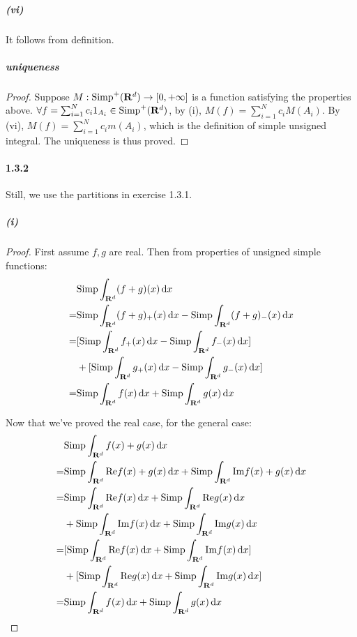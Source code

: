 \documentclass{article}
\begin{document}
\subparagraph{(vi)}
It follows from definition.
\subparagraph{uniqueness}
\begin{proof}
Suppose $M:\mathrm{Simp}^+(\mathbf{R}^d)\to [0,+\infty]$ is a function satisfying the properties above. $\forall f=\sum_{i=1}^{N} c_i1_{A_i}\in \mathrm{Simp}^+(\mathbf{R}^d)$, by (i), $M(f)=\sum_{i=1}^{N}c_iM(A_i)$. By (vi), $M(f)=\sum_{i=1}^Nc_im(A_i)$, which is the definition of simple unsigned integral. The uniqueness is thus proved.
\end{proof}

\paragraph{1.3.2}
Still, we use the partitions in exercise 1.3.1.
\subparagraph{(i)}
\begin{proof}
First assume $f,g$ are real. Then from properties of unsigned simple functions:
\[\begin{aligned}
&\mathrm{Simp}\int_{\mathbf{R}^d}(f+g)(x)\,\mathrm{d} x\\
=&\mathrm{Simp}\int_{\mathbf{R}^d}(f+g)_+(x)\,\mathrm{d} x-\mathrm{Simp}\int_{\mathbf{R}^d}(f+g)_-(x)\,\mathrm{d} x\\
=&[\mathrm{Simp}\int_{\mathbf{R}^d}f_+(x)\,\mathrm{d} x-\mathrm{Simp}\int_{\mathbf{R}^d}f_-(x)\,\mathrm{d} x]\\
&+[\mathrm{Simp}\int_{\mathbf{R}^d}g_+(x)\,\mathrm{d} x-\mathrm{Simp}\int_{\mathbf{R}^d}g_-(x)\,\mathrm{d} x]\\
=&\mathrm{Simp}\int_{\mathbf{R}^d}f(x)\,\mathrm{d} x+\mathrm{Simp}\int_{\mathbf{R}^d}g(x)\,\mathrm{d} x
\end{aligned}\]

Now that we've proved the real case, for the general case:
\[\begin{aligned}
&\mathrm{Simp}\int_{\mathbf{R}^d} f(x)+g(x)\,\mathrm{d} x\\
=&\mathrm{Simp}\int_{\mathbf{R}^d} \mathrm{Re}f(x)+g(x)\,\mathrm{d} x+\mathrm{Simp}\int_{\mathbf{R}^d} \mathrm{Im}f(x)+g(x)\,\mathrm{d} x\\
=&\mathrm{Simp}\int_{\mathbf{R}^d} \mathrm{Re}f(x)\,\mathrm{d} x+\mathrm{Simp}\int_{\mathbf{R}^d} \mathrm{Re}g(x)\,\mathrm{d} x\\
&+\mathrm{Simp}\int_{\mathbf{R}^d} \mathrm{Im}f(x)\,\mathrm{d} x+\mathrm{Simp}\int_{\mathbf{R}^d} \mathrm{Im}g(x)\,\mathrm{d} x\\
=&[\mathrm{Simp}\int_{\mathbf{R}^d} \mathrm{Re}f(x)\,\mathrm{d} x+\mathrm{Simp}\int_{\mathbf{R}^d} \mathrm{Im}f(x)\,\mathrm{d} x]\\
&+[\mathrm{Simp}\int_{\mathbf{R}^d} \mathrm{Re}g(x)\,\mathrm{d} x+\mathrm{Simp}\int_{\mathbf{R}^d} \mathrm{Im}g(x)\,\mathrm{d} x]\\
=&\mathrm{Simp}\int_{\mathbf{R}^d} f(x)\,\mathrm{d} x+\mathrm{Simp}\int_{\mathbf{R}^d} g(x)\,\mathrm{d} x
\end{aligned}\]


\end{proof}
\end{document}
